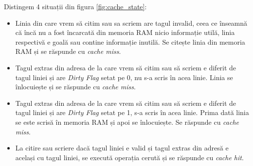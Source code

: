 \documentclass[../main.tex]{subfiles}
\begin{document}
Distingem 4 situații din figura \ref{fig:cache_state}:
\begin{itemize}
    \item Linia din care vrem să citim sau sa scriem are tagul invalid, ceea ce înseamnă că încă nu a fost încarcată din memoria RAM
    nicio informație utilă, linia respectivă e goală sau contine informație inutilă. Se citește linia din memoria RAM și
    se răspunde cu \emph{cache miss}.
    \item Tagul extras din adresa de la care vrem să citim sau să scriem e diferit de tagul liniei și are \emph{Dirty Flag} setat pe 0,
    nu s-a scris în acea linie. Linia se înlocuiește și se răspunde cu \emph{cache miss}.
    \item Tagul extras din adresa de la care vrem să citim sau să scriem e diferit de tagul liniei și are \emph{Dirty Flag} setat pe 1,
    s-a scris în acea linie. Prima dată linia se este scrisă în memoria RAM și apoi se înlocuiește. Se răspunde cu \emph{cache miss}.
    \item La citire sau scriere dacă tagul liniei e valid și tagul extras din adresă e același cu tagul liniei, se execută
    operația cerută și se răspunde cu \emph{cache hit}. 
\end{itemize}
\end{document}
